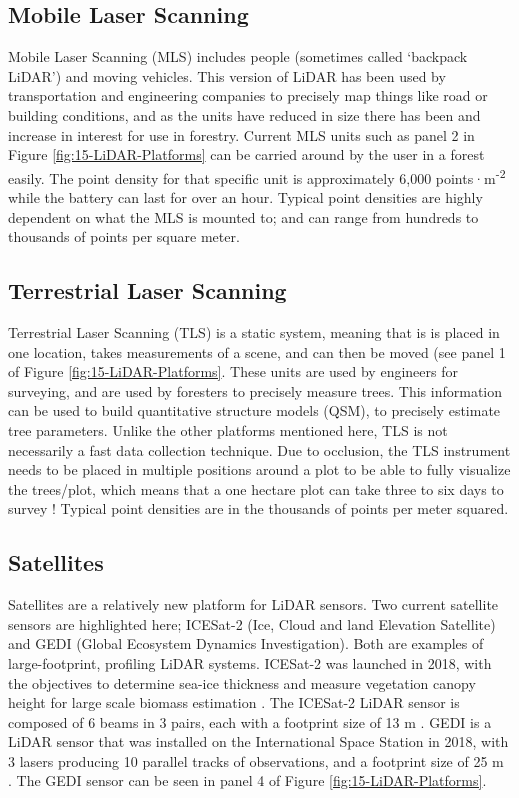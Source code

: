 \documentclass[
]{book}
\begin{document}
\subsection{Mobile Laser Scanning}\label{mobile-laser-scanning}

Mobile Laser Scanning (MLS) includes people (sometimes called `backpack LiDAR') and moving vehicles. This version of LiDAR has been used by transportation and engineering companies to precisely map things like road or building conditions, and as the units have reduced in size there has been and increase in interest for use in forestry. Current MLS units such as panel 2 in Figure \ref{fig:15-LiDAR-Platforms} can be carried around by the user in a forest easily. The point density for that specific unit is approximately 6,000 points·m\textsuperscript{-2} while the battery can last for over an hour. Typical point densities are highly dependent on what the MLS is mounted to; and can range from hundreds to thousands of points per square meter.

\subsection{Terrestrial Laser Scanning}\label{terrestrial-laser-scanning}

Terrestrial Laser Scanning (TLS) is a static system, meaning that is is placed in one location, takes measurements of a scene, and can then be moved (see panel 1 of Figure \ref{fig:15-LiDAR-Platforms}. These units are used by engineers for surveying, and are used by foresters to precisely measure trees. This information can be used to build quantitative structure models (QSM), to precisely estimate tree parameters. Unlike the other platforms mentioned here, TLS is not necessarily a fast data collection technique. Due to occlusion, the TLS instrument needs to be placed in multiple positions around a plot to be able to fully visualize the trees/plot, which means that a one hectare plot can take three to six days to survey \citep{wilkes_understanding_2015}! Typical point densities are in the thousands of points per meter squared.

\subsection{Satellites}\label{satellites}

Satellites are a relatively new platform for LiDAR sensors. Two current satellite sensors are highlighted here; ICESat-2 (Ice, Cloud and land Elevation Satellite) and GEDI (Global Ecosystem Dynamics Investigation). Both are examples of large-footprint, profiling LiDAR systems. ICESat-2 was launched in 2018, with the objectives to determine sea-ice thickness and measure vegetation canopy height for large scale biomass estimation \citep{nasa_icesat-2_2021}. The ICESat-2 LiDAR sensor is composed of 6 beams in 3 pairs, each with a footprint size of 13 m \citep{nasa_icesat-2_2021}. GEDI is a LiDAR sensor that was installed on the International Space Station in 2018, with 3 lasers producing 10 parallel tracks of observations, and a footprint size of 25 m \citep{nasa_gedi_2021}. The GEDI sensor can be seen in panel 4 of Figure \ref{fig:15-LiDAR-Platforms}.
\end{document}
